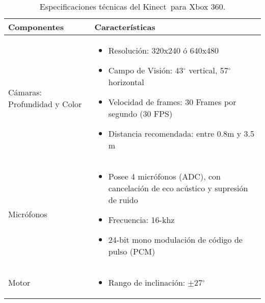 \documentclass[a4paper,openright,12pt]{report}
\begin{document}
\begin{table}[H]
	\centering
	\begin{tabular}{>{\centering\arraybackslash}m{6cm} >{\arraybackslash}m{7cm} }
		\hline
		Componentes & Características\\
		\hline \hline
		Cámaras: Profundidad y Color
		&
		\begin{itemize}
			\item Resolución: 320x240 ó 640x480
			\item Campo de Visión: 43$^{\circ}$ vertical, 57$^{\circ}$ horizontal
			\item Velocidad de frames: 30 Frames por segundo (30 FPS)
			\item Distancia recomendada: entre 0.8m y 3.5 m
		\end{itemize}	
		\\
		\hline
		Micrófonos & 
		\begin{itemize}
			\item Posee 4 micrófonos (ADC), con cancelación de eco acústico y supresión de ruido
			\item Frecuencia: 16-khz
			\item 24-bit mono modulación de código de pulso (PCM)
		\end{itemize}
		\\
		\hline
		Motor &
		\begin{itemize}
			\item  Rango de inclinación: $ \pm $27$^{\circ}$ 
		\end{itemize}\\
		\hline
	\end{tabular}
	\caption{Especificaciones técnicas del Kinect\textcopyright\ para Xbox 360.}
	\label{tabla:especKinect}
\end{table}
\end{document}
